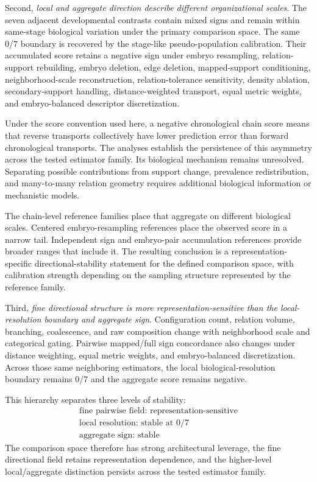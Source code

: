\documentclass[11pt]{article}
\begin{document}
Second, \textit{local and aggregate direction describe different organizational scales}. The seven adjacent developmental contrasts contain mixed signs and remain within same-stage biological variation under the primary comparison space. The same 0/7 boundary is recovered by the stage-like pseudo-population calibration. Their accumulated score retains a negative sign under embryo resampling, relation-support rebuilding, embryo deletion, edge deletion, mapped-support conditioning, neighborhood-scale reconstruction, relation-tolerance sensitivity, density ablation, secondary-support handling, distance-weighted transport, equal metric weights, and embryo-balanced descriptor discretization.

Under the score convention used here, a negative chronological chain score means that reverse transports collectively have lower prediction error than forward chronological transports. The analyses establish the persistence of this asymmetry across the tested estimator family. Its biological mechanism remains unresolved. Separating possible contributions from support change, prevalence redistribution, and many-to-many relation geometry requires additional biological information or mechanistic models.

The chain-level reference families place that aggregate on different biological scales. Centered embryo-resampling references place the observed score in a narrow tail. Independent sign and embryo-pair accumulation references provide broader ranges that include it. The resulting conclusion is a representation-specific directional-stability statement for the defined comparison space, with calibration strength depending on the sampling structure represented by the reference family.

Third, \textit{fine directional structure is more representation-sensitive than the local-resolution boundary and aggregate sign}. Configuration count, relation volume, branching, coalescence, and raw composition change with neighborhood scale and categorical gating. Pairwise mapped/full sign concordance also changes under distance weighting, equal metric weights, and embryo-balanced discretization. Across those same neighboring estimators, the local biological-resolution boundary remains 0/7 and the aggregate score remains negative.

This hierarchy separates three levels of stability:
\[
\boxed{\begin{aligned}
\text{fine pairwise field: representation-sensitive}\\
\text{local resolution: stable at }0/7\\
\text{aggregate sign: stable}
\end{aligned}}
\]
The comparison space therefore has strong architectural leverage, the fine directional field retains representation dependence, and the higher-level local/aggregate distinction persists across the tested estimator family.
\end{document}
